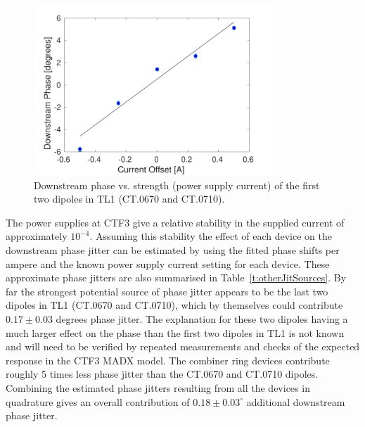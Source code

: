 \begin{figure}
  \centering
  \includegraphics[width=0.8\textwidth]{Figures/propagation/tl1670}
  \caption{Downstream phase vs. strength (power supply current) of the first two dipoles in TL1 (CT.0670 and CT.0710).}
  \label{f:tl1670}
\end{figure}



The power supplies at CTF3 give a relative stability in the supplied current of approximately \(10^{-4}\). Assuming this stability the effect of each device on the downstream phase jitter can be estimated by using the fitted phase shifts per ampere and the known power supply current setting for each device. These approximate phase jitters are also summarised in Table~\ref{t:otherJitSources}. By far the strongest potential source of phase jitter appears to be the last two dipoles in TL1 (CT.0670 and CT.0710), which by themselves could contribute \(0.17\pm0.03\) degrees phase jitter. 
The explanation for these two dipoles having a much larger effect on the phase than the first two dipoles in TL1 is not known and will need to be verified by repeated measurements and checks of the expected response in the CTF3 MADX model. The combiner ring devices contribute roughly 5 times less phase jitter than the CT.0670 and CT.0710 dipoles. 
Combining the estimated phase jitters resulting from all the devices in quadrature gives an overall contribution of \(0.18\pm0.03^\circ\) additional downstream phase jitter.

